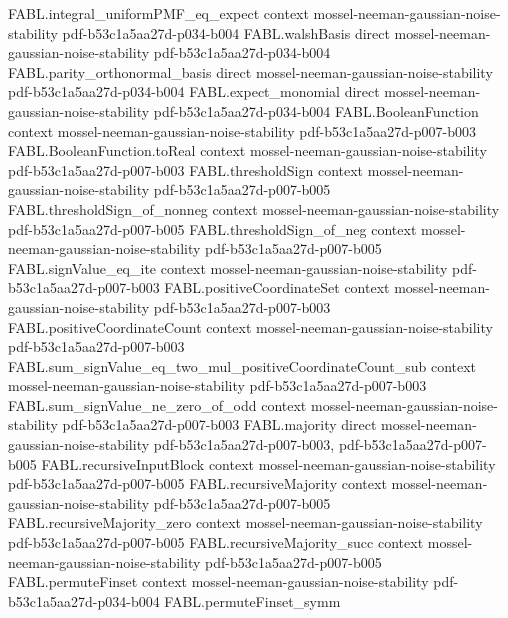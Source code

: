 \begin{theorem}
  {FABL.integral_uniformPMF_eq_expect}
  {context}
  {mossel-neeman-gaussian-noise-stability}
  {pdf-b53c1a5aa27d-p034-b004}
\proofstep
  {FABL.walshBasis}
  {direct}
  {mossel-neeman-gaussian-noise-stability}
  {pdf-b53c1a5aa27d-p034-b004}
\proofstep
  {FABL.parity_orthonormal_basis}
  {direct}
  {mossel-neeman-gaussian-noise-stability}
  {pdf-b53c1a5aa27d-p034-b004}
\proofstep
  {FABL.expect_monomial}
  {direct}
  {mossel-neeman-gaussian-noise-stability}
  {pdf-b53c1a5aa27d-p034-b004}
\proofstep
  {FABL.BooleanFunction}
  {context}
  {mossel-neeman-gaussian-noise-stability}
  {pdf-b53c1a5aa27d-p007-b003}
\proofstep
  {FABL.BooleanFunction.toReal}
  {context}
  {mossel-neeman-gaussian-noise-stability}
  {pdf-b53c1a5aa27d-p007-b003}
\proofstep
  {FABL.thresholdSign}
  {context}
  {mossel-neeman-gaussian-noise-stability}
  {pdf-b53c1a5aa27d-p007-b005}
\proofstep
  {FABL.thresholdSign_of_nonneg}
  {context}
  {mossel-neeman-gaussian-noise-stability}
  {pdf-b53c1a5aa27d-p007-b005}
\proofstep
  {FABL.thresholdSign_of_neg}
  {context}
  {mossel-neeman-gaussian-noise-stability}
  {pdf-b53c1a5aa27d-p007-b005}
\proofstep
  {FABL.signValue_eq_ite}
  {context}
  {mossel-neeman-gaussian-noise-stability}
  {pdf-b53c1a5aa27d-p007-b003}
\proofstep
  {FABL.positiveCoordinateSet}
  {context}
  {mossel-neeman-gaussian-noise-stability}
  {pdf-b53c1a5aa27d-p007-b003}
\proofstep
  {FABL.positiveCoordinateCount}
  {context}
  {mossel-neeman-gaussian-noise-stability}
  {pdf-b53c1a5aa27d-p007-b003}
\proofstep
  {FABL.sum_signValue_eq_two_mul_positiveCoordinateCount_sub}
  {context}
  {mossel-neeman-gaussian-noise-stability}
  {pdf-b53c1a5aa27d-p007-b003}
\proofstep
  {FABL.sum_signValue_ne_zero_of_odd}
  {context}
  {mossel-neeman-gaussian-noise-stability}
  {pdf-b53c1a5aa27d-p007-b003}
\proofstep
  {FABL.majority}
  {direct}
  {mossel-neeman-gaussian-noise-stability}
  {pdf-b53c1a5aa27d-p007-b003,
    pdf-b53c1a5aa27d-p007-b005}
\proofstep
  {FABL.recursiveInputBlock}
  {context}
  {mossel-neeman-gaussian-noise-stability}
  {pdf-b53c1a5aa27d-p007-b005}
\proofstep
  {FABL.recursiveMajority}
  {context}
  {mossel-neeman-gaussian-noise-stability}
  {pdf-b53c1a5aa27d-p007-b005}
\proofstep
  {FABL.recursiveMajority_zero}
  {context}
  {mossel-neeman-gaussian-noise-stability}
  {pdf-b53c1a5aa27d-p007-b005}
\proofstep
  {FABL.recursiveMajority_succ}
  {context}
  {mossel-neeman-gaussian-noise-stability}
  {pdf-b53c1a5aa27d-p007-b005}
\proofstep
  {FABL.permuteFinset}
  {context}
  {mossel-neeman-gaussian-noise-stability}
  {pdf-b53c1a5aa27d-p034-b004}
\proofstep
  {FABL.permuteFinset_symm}

\end{theorem}
